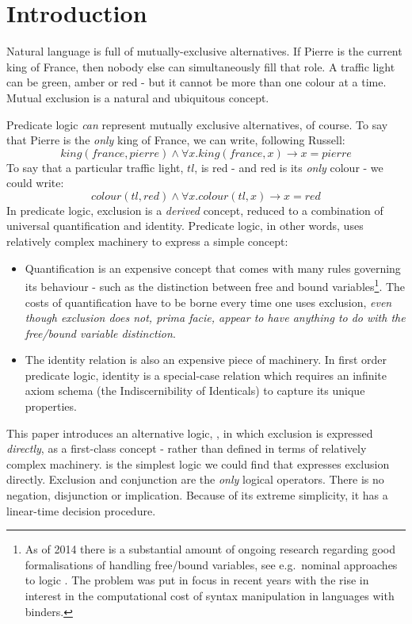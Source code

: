 \section{Introduction}\label{introduction}

Natural language is full of mutually-exclusive alternatives.
If Pierre is the current king of France, then nobody else can simultaneously fill that role.
A traffic light can be green, amber or red - but it cannot be more than one colour at a time.
Mutual exclusion is a natural and ubiquitous concept.

Predicate logic \emph{can} represent mutually exclusive alternatives, of course.
To say that Pierre is the \emph{only} king of France, we can write, following Russell:
\[
king(france, pierre) \land \forall x . king(france, x) \rightarrow x = pierre
\]
To say that a particular traffic light, $tl$, is red - and red is its \emph{only} colour - we could write:
\[
colour(tl, red) \land \forall x . colour(tl, x) \rightarrow x = red
\]
In predicate logic, exclusion is a \emph{derived} concept, reduced to a combination of universal quantification and identity.
Predicate logic, in other words, uses relatively complex machinery to express a simple concept:
\begin{itemize}
\item Quantification is an expensive concept that comes with
      many rules governing its behaviour - such as the distinction
      between free and bound variables\footnote{As of 2014 there is a substantial amount
      of ongoing research regarding good formalisations of handling
      free/bound variables, see e.g.~nominal approaches to
      logic \cite{PittsAM:newaas,PittsAM:nomsetnasics}. The problem
      was put in focus in recent years with the rise in interest in the
      computational cost of syntax manipulation in languages with
      binders.}. The costs of quantification have to be
      borne every time one uses exclusion, \emph{even though exclusion does
      not, prima facie, appear to have anything to do with the
      free/bound variable distinction}.
\item The identity relation is also an expensive piece of machinery. In first order predicate logic, identity is a special-case relation which requires an infinite axiom schema (the Indiscernibility of Identicals) to capture its unique properties.
\end{itemize}

This paper introduces an alternative logic, \ELFULL{}, in which exclusion is expressed \emph{directly}, as a first-class concept - rather than defined in terms of relatively complex machinery.
\ELFULL{} is the simplest logic we could find that expresses exclusion directly. 
Exclusion and conjunction are the \emph{only} logical operators. 
There is no negation, disjunction or implication.
Because of its extreme simplicity, it has a linear-time decision procedure.

